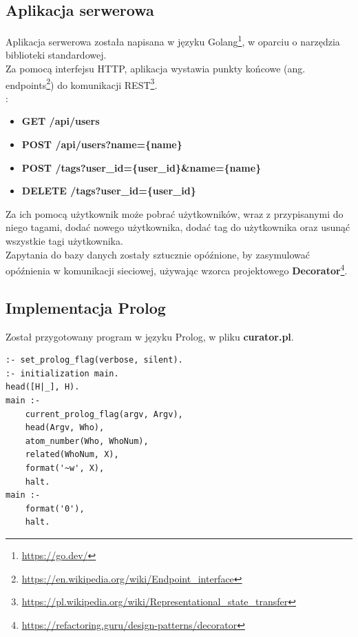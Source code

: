 \documentclass[12pt,a4paper]{article}
\begin{document}
\subsection{Aplikacja serwerowa}

Aplikacja serwerowa została napisana w języku Golang\footnote{\href{https://go.dev/}{https://go.dev/}}, w oparciu o narzędzia biblioteki standardowej.\\
Za pomocą interfejsu HTTP, aplikacja wystawia punkty końcowe (ang. endpoints\footnote{\href{https://en.wikipedia.org/wiki/Endpoint\_interface}{https://en.wikipedia.org/wiki/Endpoint\_interface}}) do komunikacji REST\footnote{\href{https://pl.wikipedia.org/wiki/Representational\_state\_transfer}{https://pl.wikipedia.org/wiki/Representational\_state\_transfer}}.\\:

\begin{itemize}
    \item \textbf{GET /api/users}
    \item \textbf{POST /api/users?name=\{name\}}
    \item \textbf{POST /tags?user\_id=\{user\_id\}\&name=\{name\}}
    \item \textbf{DELETE /tags?user\_id=\{user\_id\}}
\end{itemize}

Za ich pomocą użytkownik może pobrać użytkowników, wraz z przypisanymi do niego tagami, dodać nowego użytkownika, dodać tag do użytkownika oraz usunąć wszystkie tagi użytkownika.\\

Zapytania do bazy danych zostały sztucznie opóźnione, by zasymulować opóźnienia w komunikacji sieciowej, używając wzorca projektowego \textbf{Decorator}\footnote{\href{https://refactoring.guru/design-patterns/decorator}{https://refactoring.guru/design-patterns/decorator}}.\\

\subsection{Implementacja Prolog}

Został przygotowany program w języku Prolog, w pliku \textbf{curator.pl}.
\begin{verbatim}
:- set_prolog_flag(verbose, silent).
:- initialization main.
head([H|_], H).
main :-
    current_prolog_flag(argv, Argv),
    head(Argv, Who),
    atom_number(Who, WhoNum),
    related(WhoNum, X),
    format('~w', X),
    halt.
main :-
    format('0'),
    halt.
\end{verbatim}
\end{document}
